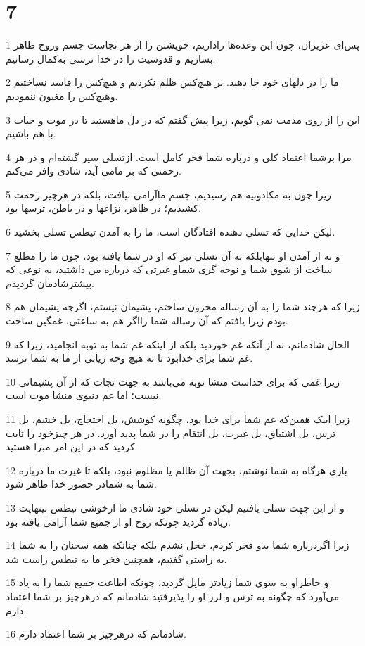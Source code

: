 \chapter{7}

\par 1 پس‌ای عزیزان، چون این وعده‌ها راداریم، خویشتن را از هر نجاست جسم وروح طاهر بسازیم و قدوسیت را در خدا ترسی به‌کمال رسانیم.
\par 2 ما را در دلهای خود جا دهید. بر هیچ‌کس ظلم نکردیم و هیچ‌کس را فاسد نساختیم وهیچ‌کس را مغبون ننمودیم.
\par 3 این را از روی مذمت نمی گویم، زیرا پیش گفتم که در دل ماهستید تا در موت و حیات با هم باشیم.
\par 4 مرا برشما اعتماد کلی و درباره شما فخر کامل است. ازتسلی سیر گشته‌ام و در هر زحمتی که بر مامی آید، شادی وافر می‌کنم.
\par 5 زیرا چون به مکادونیه هم رسیدیم، جسم ماآرامی نیافت، بلکه در هرچیز زحمت کشیدیم؛ در ظاهر، نزاعها و در باطن، ترسها بود.
\par 6 لیکن خدایی که تسلی دهنده افتادگان است، ما را به آمدن تیطس تسلی بخشید.
\par 7 و نه از آمدن او تنهابلکه به آن تسلی نیز که او در شما یافته بود، چون ما را مطلع ساخت از شوق شما و نوحه گری شماو غیرتی که درباره من داشتید، به نوعی که بیشترشادمان گردیدم.
\par 8 زیرا که هرچند شما را به آن رساله محزون ساختم، پشیمان نیستم، اگرچه پشیمان هم بودم زیرا یافتم که آن رساله شما رااگر هم به ساعتی، غمگین ساخت.
\par 9 الحال شادمانم، نه از آنکه غم خوردید بلکه از اینکه غم شما به توبه انجامید، زیرا که غم شما برای خدابود تا به هیچ وجه زیانی از ما به شما نرسد.
\par 10 زیرا غمی که برای خداست منشا توبه می‌باشد به جهت نجات که از آن پشیمانی نیست؛ اما غم دنیوی منشا موت است.
\par 11 زیرا اینک همین‌که غم شما برای خدا بود، چگونه کوشش، بل احتجاج، بل خشم، بل ترس، بل اشتیاق، بل غیرت، بل انتقام را در شما پدید آورد. در هر چیزخود را ثابت کردید که در این امر مبرا هستید.
\par 12 باری هرگاه به شما نوشتم، بجهت آن ظالم یا مظلوم نبود، بلکه تا غیرت ما درباره شما به شمادر حضور خدا ظاهر شود.
\par 13 و از این جهت تسلی یافتیم لیکن در تسلی خود شادی ما ازخوشی تیطس بینهایت زیاده گردید چونکه روح او از جمیع شما آرامی یافته بود.
\par 14 زیرا اگردرباره شما بدو فخر کردم، خجل نشدم بلکه چنانکه همه سخنان را به شما به راستی گفتیم، همچنین فخر ما به تیطس راست شد.
\par 15 و خاطراو به سوی شما زیادتر مایل گردید، چونکه اطاعت جمیع شما را به یاد می‌آورد که چگونه به ترس و لرز او را پذیرفتید.شادمانم که درهرچیز بر شما اعتماد دارم.
\par 16 شادمانم که درهرچیز بر شما اعتماد دارم.

